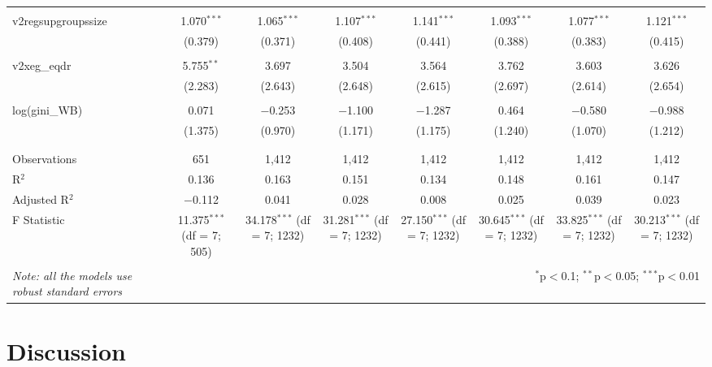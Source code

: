 \documentclass[a4paper, 12pt]{article}
\begin{document}
\begin{table}[!htbp]
{\begin{tabular}{@{\extracolsep{5pt}}lccccccc}
  & & & & & & & \\ 
 v2regsupgroupssize & 1.070$^{***}$ & 1.065$^{***}$ & 1.107$^{***}$ & 1.141$^{***}$ & 1.093$^{***}$ & 1.077$^{***}$ & 1.121$^{***}$ \\ 
  & (0.379) & (0.371) & (0.408) & (0.441) & (0.388) & (0.383) & (0.415) \\ 
  & & & & & & & \\ 
 v2xeg\_eqdr & 5.755$^{**}$ & 3.697 & 3.504 & 3.564 & 3.762 & 3.603 & 3.626 \\ 
  & (2.283) & (2.643) & (2.648) & (2.615) & (2.697) & (2.614) & (2.654) \\ 
  & & & & & & & \\ 
 log(gini\_WB) & 0.071 & $-$0.253 & $-$1.100 & $-$1.287 & 0.464 & $-$0.580 & $-$0.988 \\ 
  & (1.375) & (0.970) & (1.171) & (1.175) & (1.240) & (1.070) & (1.212) \\ 
  & & & & & & & \\ 
\hline \\[-1.8ex] 
Observations & 651 & 1,412 & 1,412 & 1,412 & 1,412 & 1,412 & 1,412 \\ 
R$^{2}$ & 0.136 & 0.163 & 0.151 & 0.134 & 0.148 & 0.161 & 0.147 \\ 
Adjusted R$^{2}$ & $-$0.112 & 0.041 & 0.028 & 0.008 & 0.025 & 0.039 & 0.023 \\ 
F Statistic & 11.375$^{***}$ (df = 7; 505) & 34.178$^{***}$ (df = 7; 1232) & 31.281$^{***}$ (df = 7; 1232) & 27.150$^{***}$ (df = 7; 1232) & 30.645$^{***}$ (df = 7; 1232) & 33.825$^{***}$ (df = 7; 1232) & 30.213$^{***}$ (df = 7; 1232) \\ 
\hline 
\hline \\[-1.8ex] 
\textit{Note: all the models use robust standard errors}  & \multicolumn{7}{r}{$^{*}$p$<$0.1; $^{**}$p$<$0.05; $^{***}$p$<$0.01} \\ 
\end{tabular} 
}
\end{table}   
    
    \section{Discussion}
    
\end{document}
